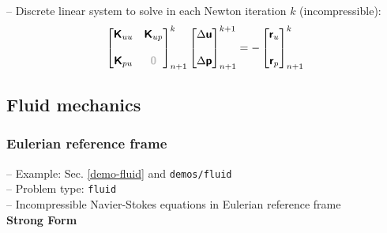 \documentclass[a4paper,12pt]{report}
\newcommand{\bs}[1]{\boldsymbol{#1}}
\newcommand{\zerom}{\textcolor{lightgray}{\bs{\mathsf{0}}}}
\newcommand{\ROP}{\bs{\mathsf{r}}}
\begin{document}
-- Discrete linear system to solve in each Newton iteration $k$ (incompressible):
\begin{equation}
\label{equation-lin-sys-solid-inc}
\begin{aligned}
\begin{bmatrix} \boldsymbol{\mathsf{K}}_{uu} & \boldsymbol{\mathsf{K}}_{up} \\ \\ \boldsymbol{\mathsf{K}}_{pu} & \zerom \end{bmatrix}_{n+1}^{k}\begin{bmatrix} \Delta\boldsymbol{\mathsf{u}} \\ \\ \Delta\boldsymbol{\mathsf{p}} \end{bmatrix}_{n+1}^{k+1}=-\begin{bmatrix} \ROP_{u} \\ \\ \ROP_{p} \end{bmatrix}_{n+1}^{k}
\end{aligned}
\end{equation}




\subsection{Fluid mechanics}\label{fluid-mechanics}

\subsubsection{Eulerian reference frame}\label{eulerian-reference-frame}

-- Example: Sec. \ref{demo-fluid} and \verb"demos/fluid"\\

-- Problem type: \verb.fluid.\\

-- Incompressible Navier-Stokes equations in Eulerian reference frame\\

\textbf{Strong Form}\\
\end{document}
